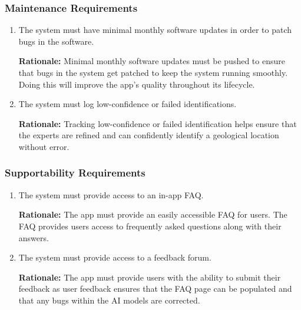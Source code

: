 \documentclass[]{article}
\begin{document}
\subsubsection{Maintenance Requirements}
\label{ssub:maintenance_requirements}
\begin{enumerate}[{MS-M}1. ]
	\item The system must have minimal monthly software updates in order to patch bugs in the software. 

    {\bf Rationale:} Minimal monthly software updates must be pushed to ensure that bugs in the system get patched to keep the system running smoothly. Doing this will improve the app's quality throughout its lifecycle. 
    \item The system must log low-confidence or failed identifications. 

    {\bf Rationale:} Tracking low-confidence or failed identification helps ensure that the experts are refined and can confidently identify a geological location without error. 
\end{enumerate}

\subsubsection{Supportability Requirements}
\label{ssub:supportability_requirements}
\begin{enumerate}[{MS-S}1. ]
	\item The system must provide access to an in-app FAQ. 

    {\bf Rationale:} The app must provide an easily accessible FAQ for users. The FAQ provides users access to frequently asked questions along with their answers.
    \item The system must provide access to a feedback forum. 

    {\bf Rationale:} The app must provide users with the ability to submit their feedback as user feedback ensures that the FAQ page can be populated and that any bugs within the AI models are corrected. 
\end{enumerate}
\end{document}
